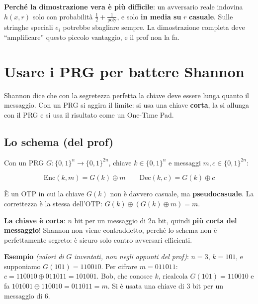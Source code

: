 \textbf{Perché la dimostrazione vera è più difficile}: un avversario reale indovina \(h(x, r)\) solo con probabilità \(\frac{1}{2} + \frac{1}{\text{poly}}\), e solo \textbf{in media su} \(r\) \textbf{casuale}. Sulle stringhe speciali \(e_i\) potrebbe sbagliare sempre. La dimostrazione completa deve ``amplificare'' questo piccolo vantaggio, e il prof non la fa.

\section{Usare i PRG per battere Shannon}

\begin{inbreve}

Shannon dice che con la segretezza perfetta la chiave deve essere lunga quanto il messaggio. Con un PRG si aggira il limite: si usa una chiave \textbf{corta}, la si allunga con il PRG e si usa il risultato come un One-Time Pad.

\end{inbreve}

\subsection{Lo schema (del prof)}

Con un PRG \(G : \{0,1\}^n \to \{0,1\}^{2n}\), chiave \(k \in \{0,1\}^n\) e messaggi \(m, c \in \{0,1\}^{2n}\):

\[
\text{Enc}(k, m) = G(k) \oplus m \qquad \text{Dec}(k, c) = G(k) \oplus c
\]

È un OTP in cui la chiave \(G(k)\) non è davvero casuale, ma \textbf{pseudocasuale}. La correttezza è la stessa dell'OTP: \(G(k) \oplus (G(k) \oplus m) = m\).

\textbf{La chiave è corta}: \(n\) bit per un messaggio di \(2n\) bit, quindi \textbf{più corta del messaggio}! Shannon non viene contraddetto, perché lo schema non è perfettamente segreto: è sicuro solo contro avversari efficienti.

\begin{esempio}

\textbf{Esempio} \emph{(valori di} \(G\) \emph{inventati, non negli appunti del prof)}: \(n = 3\), \(k = 101\), e supponiamo \(G(101) = 110010\). Per cifrare \(m = 011011\): \(c = 110010 \oplus 011011 = 101001\). Bob, che conosce \(k\), ricalcola \(G(101) = 110010\) e fa \(101001 \oplus 110010 = 011011 = m\). Si è usata una chiave di 3 bit per un messaggio di 6.

\end{esempio}

